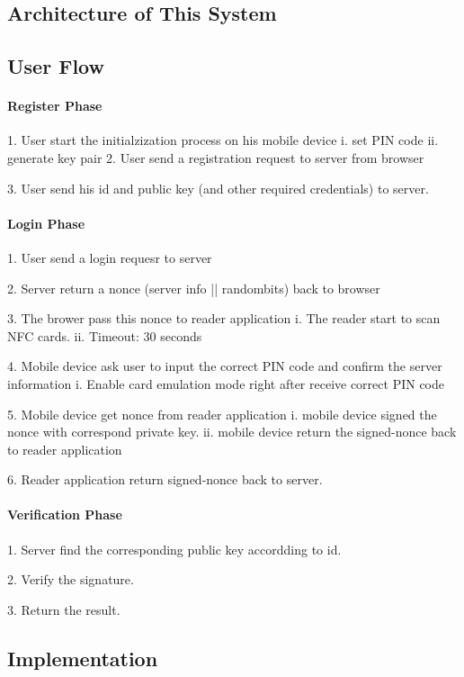 \begin{CJK}{Bg5}{bsmi}


\chapter{Architecture of This System}

\section{User Flow}

\subsubsection{Register Phase}

	1. 	User start the initialzization process on his mobile device
		i.  set PIN code
		ii. generate key pair
	2.	User send a registration request to server from browser

	3.	User send his id and public key (and other required credentials) to server.

\subsubsection{Login Phase}

	1. User send a login requesr to server

	2. Server return a nonce ({server info || randombits}) back to browser

	3. The brower pass this nonce to reader application
		i.	The reader start to scan NFC cards.
		ii.	Timeout: 30 seconds

	4. Mobile device ask user to input the correct PIN code and confirm the server information
		i.	Enable card emulation mode right after receive correct PIN code

	5. Mobile device get nonce from reader application
		i.	mobile device signed the nonce with correspond private key.
		ii.	mobile device return the signed-nonce back to reader application

	6. Reader application return signed-nonce back to server.

\subsubsection{Verification Phase}

	1. Server find the corresponding public key accordding to id.

	2. Verify the signature.

	3. Return the result.

\section{Implementation}

\end{CJK}